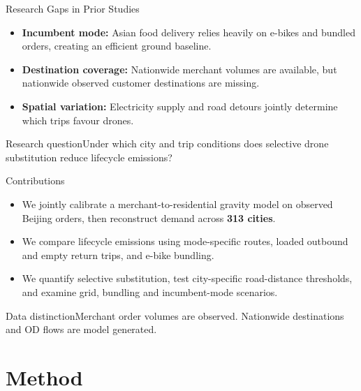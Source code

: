 \documentclass[9pt]{beamer}
\begin{document}
\begin{frame}{Research Gaps in Prior Studies}
\begin{itemize}
  \item \textbf{Incumbent mode:} Asian food delivery relies heavily on e-bikes and bundled orders, creating an efficient ground baseline.
  \item \textbf{Destination coverage:} Nationwide merchant volumes are available, but nationwide observed customer destinations are missing.
  \item \textbf{Spatial variation:} Electricity supply and road detours jointly determine which trips favour drones.
\end{itemize}
\begin{block}{Research question}Under which city and trip conditions does selective drone substitution reduce lifecycle emissions?\end{block}
\end{frame}

\begin{frame}{Contributions}
\begin{itemize}
  \item We jointly calibrate a merchant-to-residential gravity model on observed Beijing orders, then reconstruct demand across \textbf{313 cities}.
  \item We compare lifecycle emissions using mode-specific routes, loaded outbound and empty return trips, and e-bike bundling.
  \item We quantify selective substitution, test city-specific road-distance thresholds, and examine grid, bundling and incumbent-mode scenarios.
\end{itemize}
\begin{block}{Data distinction}Merchant order volumes are observed. Nationwide destinations and OD flows are model generated.\end{block}
\end{frame}

\section{Method}
\end{document}

